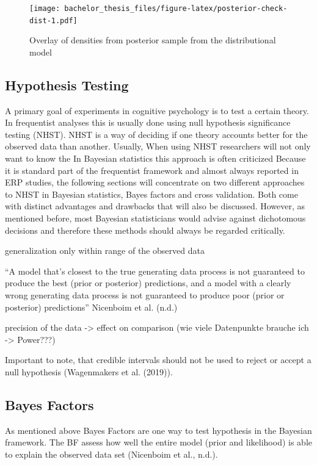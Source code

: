 \documentclass[
  doc,12pt,floatsintext]{apa7}
\begin{document}
\begin{figure}
\centering
\texttt{[image: bachelor\_thesis\_files/figure-latex/posterior-check-dist-1.pdf]}
\caption{\label{fig:posterior-check-dist}Overlay of densities from posterior sample from the distributional model}
\end{figure}

\subsection{Hypothesis Testing}\label{hypothesis-testing}

A primary goal of experiments in cognitive psychology is to test a certain theory. In frequentist analyses this is usually done using null hypothesis significance testing (NHST). NHST is a way of deciding if one theory accounts better for the observed data than another. Usually,
When using NHST researchers will not only want to know the
In Bayesian statistics this approach is often criticized
Because it is standard part of the frequentist framework and almost always reported in ERP studies, the following sections will concentrate on two different approaches to NHST in Bayesian statistics, Bayes factors and cross validation. Both come with distinct advantages and drawbacks that will also be discussed. However, as mentioned before, most Bayesian statisticians would advise against dichotomous decisions and therefore these methods should always be regarded critically.

generalization only within range of the observed data

``A model that's closest to the true generating data process is not guaranteed to produce the best (prior or posterior) predictions, and a model with a clearly wrong generating data process is not guaranteed to produce poor (prior or posterior) predictions'' Nicenboim et al. (n.d.)

precision of the data -\textgreater{} effect on comparison (wie viele Datenpunkte brauche ich -\textgreater{} Power???)

Important to note, that credible intervals should not be used to reject or accept a null hypothesis (Wagenmakers et al. (2019)).

\subsection{Bayes Factors}\label{bayes-factors}

As mentioned above Bayes Factors are one way to test hypothesis in the Bayesian framework. The BF assess how well the entire model (prior and likelihood) is able to explain the observed data set (Nicenboim et al., n.d.).
\end{document}
